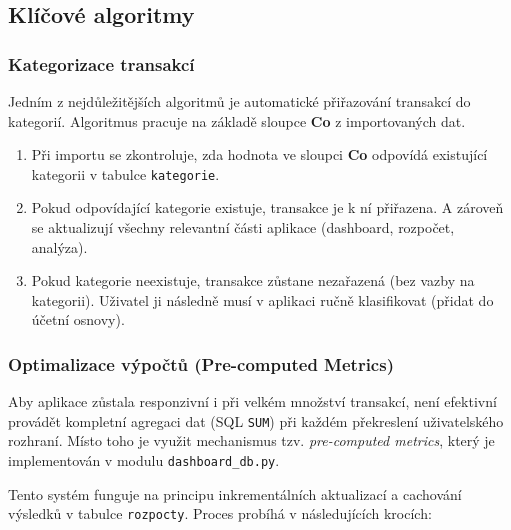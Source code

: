 \documentclass[
program=itk,
biblatex,
language=czech,
font=sans,
figures=true,
tables=false,
sourcecodes=false,
glossaries,
index
]{kidiplom}
\begin{document}
\subsection{Klíčové algoritmy}
\subsubsection{Kategorizace transakcí}
Jedním z nejdůležitějších algoritmů je automatické přiřazování transakcí do kategorií. Algoritmus pracuje na základě sloupce \textbf{Co} z importovaných dat.
\begin{enumerate}
    \item Při importu se zkontroluje, zda hodnota ve sloupci \textbf{Co} odpovídá existující kategorii v tabulce \texttt{kategorie}.
    \item Pokud odpovídající kategorie existuje, transakce je k ní přiřazena. A zároveň se aktualizují všechny relevantní části aplikace (dashboard, rozpočet, analýza).
    \item Pokud kategorie neexistuje, transakce zůstane nezařazená (bez vazby na kategorii). Uživatel ji následně musí v aplikaci ručně klasifikovat (přidat do účetní osnovy).
\end{enumerate}

\subsubsection{Optimalizace výpočtů (Pre-computed Metrics)}
Aby aplikace zůstala responzivní i při velkém množství transakcí, není efektivní provádět kompletní agregaci dat (SQL \texttt{SUM}) při každém překreslení uživatelského rozhraní. Místo toho je využit mechanismus tzv. \textit{pre-computed metrics}, který je implementován v modulu \texttt{dashboard\_db.py}.

Tento systém funguje na principu inkrementálních aktualizací a cachování výsledků v tabulce \texttt{rozpocty}. Proces probíhá v následujících krocích:
\end{document}
